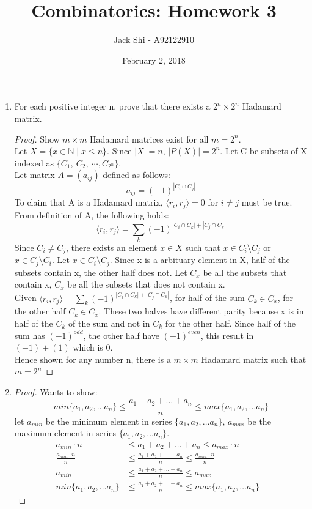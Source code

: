 \documentclass{article}
\title{Combinatorics: Homework 3}
\author{Jack Shi - A92122910}
\date{February 2, 2018}
\begin{document}
\maketitle

\begin{enumerate} [label=\textbf{\arabic*}.]
	\item For each positive integer n, prove that there exists a $2^n\times 2^n$
		Hadamard matrix.
	\begin{proof} 
		Show $m\times m$ Hadamard matrices exist for all $m=2^n$.\\
		Let $X=\{x\in\mathbb{N} \mid x \le n\}$. Since $|X|=n$, $|P(X)|=2^n$.
		Let C be subsets of X indexed as $\{C_1,\ C_2,\ \cdots,C_{2^n}\}$.\\
		Let matrix $A=(a_{ij})$ defined as follows: 
			$$a_{ij}=(-1)^{|C_i\cap C_j|}$$
		To claim that A is a Hadamard matrix, $\langle r_i,r_j\rangle=0$ for
		$i\neq j$ must be true.
		From definition of A, the following holds:
			$$\langle r_i,r_j \rangle=\sum_k (-1)^{|C_i\cap C_k| + |C_j\cap C_k|}$$
		Since $C_i \neq C_j$, there exists an element $x \in X$ such that $x\in
		C_i \setminus C_j$ or $x\in C_j \setminus C_i$. Let $x\in C_i \setminus
		C_j$. Since x is a arbituary element in X, half of the subsets contain
		x, the other half does not. Let $C_x$ be all the subsets that contain x,
		$C_{\bar{x}}$ be all the subsets that does not contain x.\\
		Given $\langle r_i,r_j \rangle=\sum_k (-1)^{|C_i\cap C_k| + |C_j\cap C_k|}$,
		for half of the sum $C_k \in C_x$, for the other half $C_k \in C_{\bar{x}}$.
		These two halves have different parity because x is in half of the $C_k$ of
		the sum and not in $C_k$ for the other half. Since half of the sum has
		$(-1)^{odd}$, the other half have $(-1)^{even}$, this result in $(-1) + (1)$
		which is 0.\\

		Hence shown for any number n, there is a $m\times m$ Hadamard matrix such
		that $m = 2^n$
	\end{proof}

	\item 
		\begin{proof} Wants to show:
			$$min\{a_1, a_2, \dots a_n\} \le \frac{a_1 + a_2 + \dots + a_n}{n}
			\le max\{a_1, a_2, \dots a_n\}$$
			let $a_{min}$ be the minimum element in series $\{a_1, a_2, \dots a_n\}$,
			$a_{max}$ be the maximum element in series $\{a_1, a_2, \dots a_n\}$. 
			\begin{align*}
				a_{min} \cdot n &\le a_1 + a_2 + \dots + a_n \le a_{max} \cdot n &\\
				\frac{a_{min} \cdot n}{n} &\le \frac{a_1 + a_2 + \dots + a_n}{n} \le
				\frac{a_{max}\cdot n}{n} &\\
				a_{min} &\le \frac{a_1 + a_2 + \dots + a_n}{n} \le a_{max}& \\
				min\{a_1, a_2, \dots a_n\} &\le \frac{a_1 + a_2 + \dots + a_n}{n}
				\le max\{a_1, a_2, \dots a_n\} &
			\end{align*}
		\end{proof}


\end{enumerate}
\end{document}
